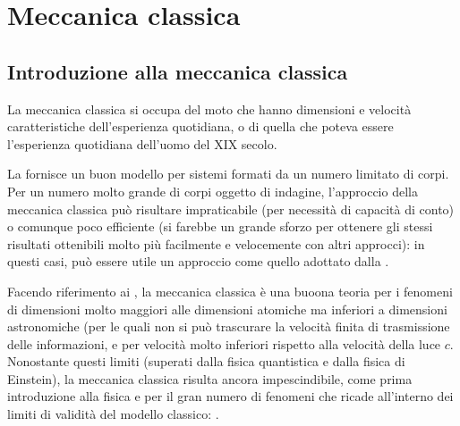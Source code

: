 \documentclass[letterpaper,10pt,italian]{jupyterBook}
\begin{document}
\sphinxstepscope


\part{Meccanica classica}

\sphinxstepscope




\chapter{Introduzione alla meccanica classica}
\label{\detokenize{ch/mechanics/intro:introduzione-alla-meccanica-classica}}\label{\detokenize{ch/mechanics/intro:physics-hs-mechanics-intro}}\label{\detokenize{ch/mechanics/intro::doc}}
\sphinxAtStartPar
La meccanica classica si occupa del moto che hanno dimensioni e velocità caratteristiche dell’esperienza quotidiana, o di quella che poteva essere l’esperienza quotidiana dell’uomo del XIX secolo.

\sphinxAtStartPar
La  fornisce un buon modello  per sistemi formati da un numero limitato di corpi. Per un numero molto grande di corpi oggetto di indagine, l’approccio della meccanica classica può risultare impraticabile (per necessità di capacità di conto) o comunque poco efficiente (si farebbe un grande sforzo per ottenere gli stessi risultati ottenibili molto più facilmente e velocemente con altri approcci): in questi casi, può essere utile un approccio  come quello adottato dalla {\hyperref[\detokenize{ch/thermodynamics/foundation:physics-hs-thermodynamics-intro}]{}}.

\sphinxAtStartPar
Facendo riferimento ai {\hyperref[\detokenize{ch/intro/current-status:physics-hs-intro-current-status-regimes}]{}}, la meccanica classica è una buoona teoria per i fenomeni di dimensioni molto maggiori alle dimensioni atomiche ma inferiori a dimensioni astronomiche (per le quali non si può trascurare la velocità finita di trasmissione delle informazioni, e per velocità molto inferiori rispetto alla velocità della luce \(c\). Nonostante questi limiti (superati dalla fisica quantistica e dalla fisica di Einstein), la meccanica classica risulta ancora impescindibile, come prima introduzione alla fisica e per il gran numero di fenomeni che ricade all’interno dei limiti di validità del modello classico: .
\end{document}
